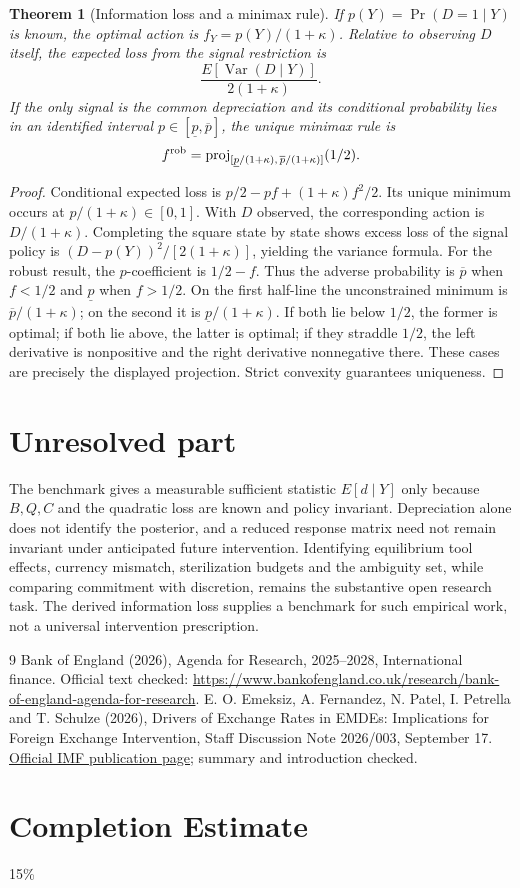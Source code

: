 \documentclass[11pt]{article}
\newtheorem{theorem}{Theorem}
\theoremstyle{definition}
\begin{document}
\begin{theorem}[Information loss and a minimax rule]
If $p(Y)=\Pr(D=1\mid Y)$ is known, the optimal action is $f_Y=p(Y)/(1+\kappa)$. Relative to observing $D$ itself, the expected loss from the signal restriction is
\[
 \frac{E[\operatorname{Var}(D\mid Y)]}{2(1+\kappa)}.
\]
If the only signal is the common depreciation and its conditional probability lies in an identified interval $p\in[\underline p,\overline p]$, the unique minimax rule is
\[
 f^{\rm rob}=\operatorname{proj}_{[\underline p/(1+\kappa),\,
                \overline p/(1+\kappa)]}(1/2).
\]
\end{theorem}
\begin{proof}
Conditional expected loss is $p/2-pf+(1+\kappa)f^2/2$. Its unique minimum occurs at $p/(1+\kappa)\in[0,1]$. With $D$ observed, the corresponding action is $D/(1+\kappa)$. Completing the square state by state shows excess loss of the signal policy is $(D-p(Y))^2/[2(1+\kappa)]$, yielding the variance formula.
For the robust result, the $p$-coefficient is $1/2-f$. Thus the adverse probability is $\overline p$ when $f<1/2$ and $\underline p$ when $f>1/2$. On the first half-line the unconstrained minimum is $\overline p/(1+\kappa)$; on the second it is $\underline p/(1+\kappa)$. If both lie below $1/2$, the former is optimal; if both lie above, the latter is optimal; if they straddle $1/2$, the left derivative is nonpositive and the right derivative nonnegative there. These cases are precisely the displayed projection. Strict convexity guarantees uniqueness.
\end{proof}

\section*{Unresolved part}
The benchmark gives a measurable sufficient statistic $E[d\mid Y]$ only because $B,Q,C$ and the quadratic loss are known and policy invariant. Depreciation alone does not identify the posterior, and a reduced response matrix need not remain invariant under anticipated future intervention. Identifying equilibrium tool effects, currency mismatch, sterilization budgets and the ambiguity set, while comparing commitment with discretion, remains the substantive open research task. The derived information loss supplies a benchmark for such empirical work, not a universal intervention prescription.
\begin{thebibliography}{9}
 Bank of England (2026), Agenda for Research, 2025--2028, International finance. Official text checked: \url{https://www.bankofengland.co.uk/research/bank-of-england-agenda-for-research}.
 E. O. Emeksiz, A. Fernandez, N. Patel, I. Petrella and T. Schulze (2026), Drivers of Exchange Rates in EMDEs: Implications for Foreign Exchange Intervention, Staff Discussion Note 2026/003, September 17. \href{https://www.imf.org/en/publications/staff-discussion-notes/issues/2026/09/16/drivers-of-exchange-rates-in-emdes-implications-for-foreign-exchange-intervention-578715}{Official IMF publication page}; summary and introduction checked.
\end{thebibliography}

\section{Completion Estimate}
15\%
\end{document}
